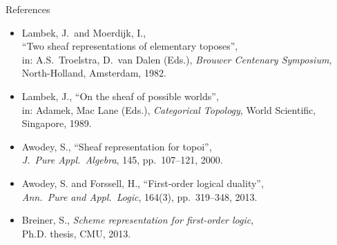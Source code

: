 \documentclass{beamer}
\begin{document}
\begin{frame}{References}

\begin{itemize}
\item Lambek, J.\ and Moerdijk, I.,\\
 ``Two sheaf representations of elementary toposes'',\\
in: A.S.\ Troelstra, D.\ van Dalen (Eds.), \emph{Brouwer Centenary Symposium}, North-Holland, Amsterdam, 1982.
\item Lambek, J., ``On the sheaf of possible worlds'',\\
 in: Adamek, Mac Lane (Eds.), \emph{Categorical Topology}, World Scientific, Singapore, 1989.
\item Awodey, S., ``Sheaf representation for topoi'',\\
 \emph{J.\ Pure Appl.\ Algebra}, 145, pp.~107--121, 2000.
\item Awodey, S. and Forssell, H., ``First-order logical duality'',\\
 \emph{Ann.\ Pure and Appl.\ Logic}, 164(3), pp.~319--348, 2013.
\item Breiner, S., \emph{Scheme representation for first-order logic},\\
 Ph.D. thesis, CMU, 2013.
\end{itemize}

\end{frame}








\end{document}
